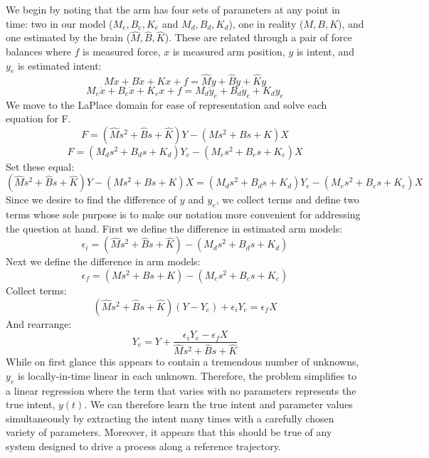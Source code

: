 \documentclass[10pt]{article}
\begin{document}
We begin by noting that the arm has four sets of parameters at any point in time: two in our model ($M_e, B_e, K_e$ and $M_d, B_d, K_d$), one in reality ($M, B, K$), and one estimated by the brain ($\hat{M}, \hat{B}, \hat{K}$). These are related through a pair of force balances where $f$ is measured force, $x$ is measured arm position, $y$ is intent, and $y_e$ is estimated intent:
\begin{equation}
M\ddot{x}+B\dot{x}+Kx+f=\hat{M}\ddot{y}+\hat{B}\dot{y}+\hat{K}y
\end{equation}
\begin{equation}
M_e\ddot{x}+B_e\dot{x}+K_ex+f=M_d\ddot{y}_e+B_d\dot{y}_e+K_dy_e
\end{equation}
We move to the LaPlace domain for ease of representation and solve each equation for F.
\begin{equation}
F=(\hat{M}s^2+\hat{B}s+\hat{K})Y-(Ms^2+Bs+K)X
\end{equation}
\begin{equation}
F=(M_ds^2+B_ds+K_d)Y_e-(M_es^2+B_es+K_e)X
\end{equation}
Set these equal:
\begin{equation}
(\hat{M}s^2+\hat{B}s+\hat{K})Y-(Ms^2+Bs+K)X=(M_ds^2+B_ds+K_d)Y_e-(M_es^2+B_es+K_e)X
\end{equation}
Since we desire to find the difference of $y$ and $y_e$, we collect terms and define two terms whose sole purpose is to make our notation more convenient for addressing the question at hand. First we define the difference in estimated arm models:
\begin{equation}
\epsilon_i=(\hat{M}s^2+\hat{B}s+\hat{K})-(M_ds^2+B_ds+K_d)
\end{equation}
Next we define the difference in arm models:
\begin{equation}
\epsilon_f=(Ms^2+Bs+K)-(M_es^2+B_es+K_e)
\end{equation}
Collect terms:
\begin{equation}
(\hat{M}s^2+\hat{B}s+\hat{K})(Y-Y_e)+\epsilon_i Y_e=\epsilon_f X
\end{equation}
And rearrange:
\begin{equation}
Y_e=Y+\frac{\epsilon_i Y_e-\epsilon_f X}{\hat{M}s^2+\hat{B}s+\hat{K}}
\end{equation}
While on first glance this appears to contain a tremendous number of unknowns, $y_e$ is locally-in-time linear in each unknown. Therefore, the problem simplifies to a linear regression where the term that varies with no parameters represents the true intent, $y(t)$. We can therefore learn the true intent and parameter values simultaneously by extracting the intent many times with a carefully chosen variety of parameters. Moreover, it appears that this should be true of any system designed to drive a process along a reference trajectory.
\end{document}
